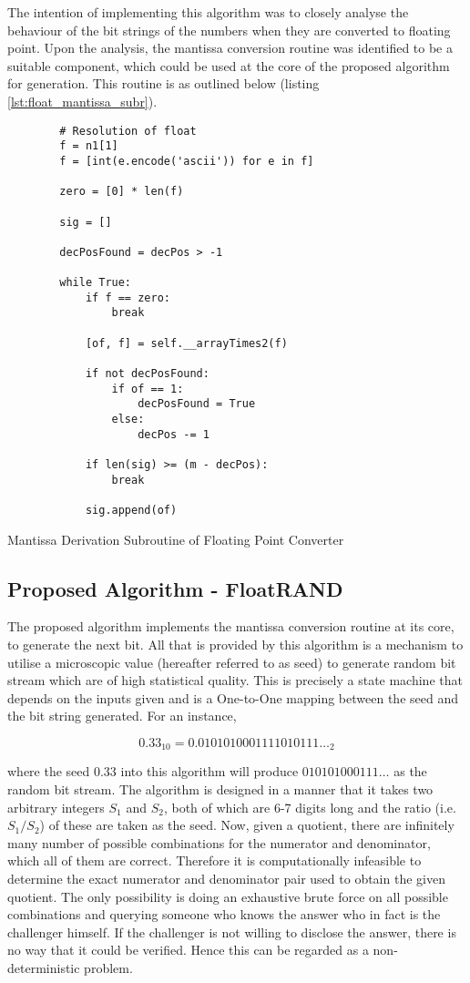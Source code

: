 The intention of implementing this algorithm was to closely analyse the behaviour of the bit strings of the numbers when they are converted to floating point. Upon the analysis, the mantissa conversion routine was identified to be a suitable component, which could be used at the core of the proposed algorithm for generation. This routine is as outlined below (listing \ref{lst:float_mantissa_subr}).

\begin{code}
    \begin{verbatim}
        # Resolution of float
		f = n1[1]
		f = [int(e.encode('ascii')) for e in f]

		zero = [0] * len(f)

		sig = []

		decPosFound = decPos > -1

		while True:
			if f == zero:
				break
			
			[of, f] = self.__arrayTimes2(f)

			if not decPosFound:
				if of == 1:
					decPosFound = True
				else:
					decPos -= 1
			
			if len(sig) >= (m - decPos):
				break

			sig.append(of)
    \end{verbatim}
    \caption{Mantissa Derivation Subroutine of Floating Point Converter}
    \label{lst:float_mantissa_subr}
\end{code}

\subsection{Proposed Algorithm - FloatRAND}

The proposed algorithm implements the mantissa conversion routine at its core, to generate the next bit. All that is provided by this algorithm is a mechanism to utilise a microscopic value (hereafter referred to as seed) to generate random bit stream which are of high statistical quality. This is precisely a state machine that depends on the inputs given and is a One-to-One mapping between the seed and the bit string generated. For an instance,

\[
    0.33_{10} = 0.0101010001111010111\ldots_{2}
\]

where the seed 0.33 into this algorithm will produce $010101000111\ldots$ as the random bit stream. The algorithm is designed in a manner that it takes two arbitrary integers $S_1$ and $S_2$, both of which are 6-7 digits long and the ratio (i.e. $S_1/S_2$) of these are taken as the seed. Now, given a quotient, there are infinitely many number of possible combinations for the numerator and denominator, which all of them are correct. Therefore it is computationally infeasible to determine the exact numerator and denominator pair used to obtain the given quotient. The only possibility is doing an exhaustive brute force on all possible combinations and querying someone who knows the answer who in fact is the challenger himself. If the challenger is not willing to disclose the answer, there is no way that it could be verified. Hence this can be regarded as a non-deterministic problem.

